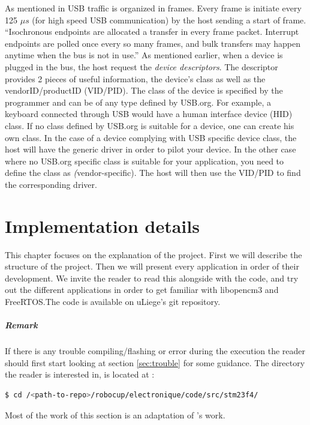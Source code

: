 \documentclass[12pt,a4paper]{report}
\begin{document}
As mentioned in \cite{usb-explained} USB traffic is organized in frames. Every frame is initiate every 125 $\mu s$ (for high speed USB communication) by the host sending a start of frame. ``Isochronous endpoints are allocated a transfer in every frame packet. Interrupt endpoints are polled once every so many frames, and bulk transfers may happen anytime when the bus is not in use.''\newline
As mentioned earlier, when a device is plugged in the bus, the host request the \emph{device descriptors}. The descriptor provides 2 pieces of useful information, the device's class as well as the vendorID/productID (VID/PID). The class of the device is specified by the programmer and can be of any type defined by USB.org. For example, a keyboard connected through USB would have a human interface device (HID) class. If no class defined by USB.org is suitable for a device, one can create his own class.\newline
In the case of a device complying with USB specific device class, the host will have the generic driver in order to pilot your device. In the other case where no USB.org specific class is suitable for your application, you need to define the class as \emph(vendor-specific). The host will then use the VID/PID to find the corresponding driver.\newline
\chapter{Implementation details}
\label{chap:impl}
This chapter focuses on the explanation of the project. First we will describe the structure of the project. Then we will present every application in order of their development. We invite the reader to read this alongside with the code, and try out the different applications in order to get familiar with libopencm3 and FreeRTOS.\newline The code is available on uLiege's git repository. 
\paragraph{Remark} If there is any trouble compiling/flashing or error during the execution the reader should first start looking at section \ref{sec:trouble} for some guidance.\newline
\noindent The directory the reader is interested in, is located at :
\begin{lstlisting}[language=bash]
$ cd /<path-to-repo>/robocup/electronique/code/src/stm23f4/
\end{lstlisting}
Most of the work of this section is an adaptation of \cite{Gay2018}'s work. 
\end{document}
